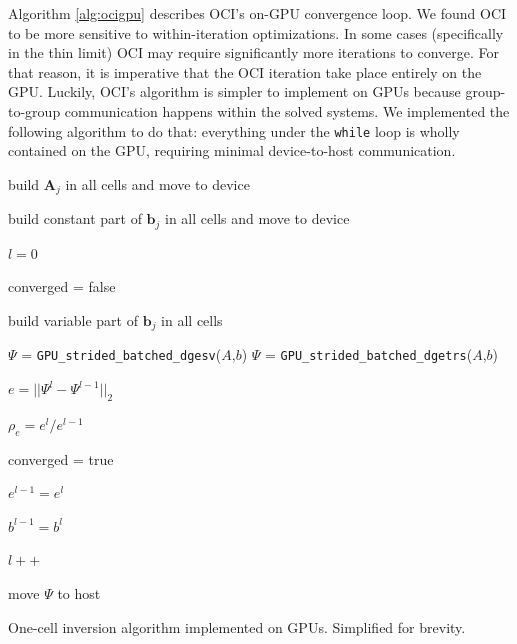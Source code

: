 Algorithm \ref{alg:ocigpu} describes OCI's on-GPU convergence loop.
We found OCI to be more sensitive to within-iteration optimizations.
In some cases (specifically in the thin limit) OCI may require significantly more iterations to converge.
For that reason, it is imperative that the OCI iteration take place entirely on the GPU.
Luckily, OCI's algorithm is simpler to implement on GPUs because group-to-group communication happens within the solved systems.
We implemented the following algorithm to do that: everything under the \texttt{while} loop is wholly contained on the GPU, requiring minimal device-to-host communication.

\begin{algorithm}
\begin{algorithmic}[1]
    \State build $\bm{A}_j$ in all cells and move to device 

    \State build constant part of $\bm{b}_j$ in all cells and move to device 

    \State $l = 0$ 

    \State converged = false

        
        \State build variable part of $\bm{b}_j$ in all cells 

            \State $\Psi$ = \texttt{GPU\_strided\_batched\_dgesv}($A$,$b$)
        \Else
            \State $\Psi$ = \texttt{GPU\_strided\_batched\_dgetrs}($A$,$b$) 
        \EndIf

        \State $e=||\Psi^l - \Psi^{l-1}||_2$ 

        \State $\rho_e = e^l / e^{l-1}$ 

         
            \State converged = true
        \EndIf

        \State $e^{l-1} = e^l$

        \State $b^{l-1} = b^l$

        \State $l++$
            
    \EndWhile
    
    \State move $\Psi$ to host
    \caption{One-cell inversion algorithm implemented on GPUs. Simplified for brevity.}
    \label{alg:ocigpu}
\end{algorithmic}
\end{algorithm}

